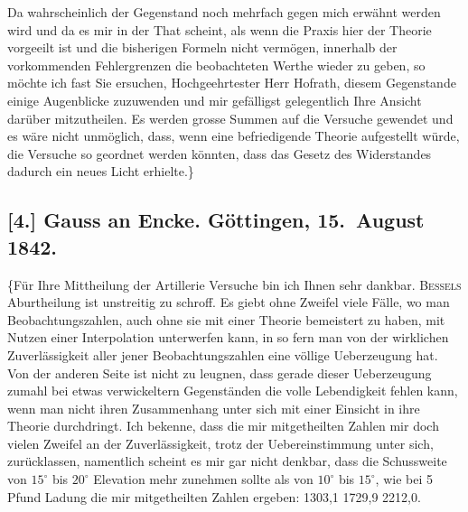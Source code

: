 \documentclass[12pt,a4paper]{article}
\begin{document}
Da wahrscheinlich der Gegenstand noch mehrfach gegen mich erw\"ahnt werden wird und da es mir in der That scheint, als wenn die Praxis hier der Theorie vorgeeilt ist und die bisherigen Formeln nicht verm\"ogen, innerhalb der vorkommenden Fehlergrenzen die beobachteten Werthe wieder zu geben, so m\"ochte ich fast Sie ersuchen, Hochgeehrtester Herr Hofrath, diesem Gegenstande einige Augenblicke zuzuwenden und mir gef\"alligst gelegentlich Ihre Ansicht dar\"uber mitzutheilen. Es werden grosse Summen auf die Versuche gewendet und es w\"are nicht unm\"oglich, dass, wenn eine befriedigende Theorie aufgestellt w\"urde, die Versuche so geordnet werden k\"onnten, dass das Gesetz des Widerstandes dadurch ein neues Licht erhielte.\dotfill\}


\subsection*{[4.] Gauss an Encke. G\"ottingen, 15.~August 1842.}

\{F\"ur Ihre Mittheilung der Artillerie Versuche bin ich Ihnen sehr dankbar. \textsc{Bessels} Aburtheilung ist unstreitig zu schroff. Es giebt ohne Zweifel viele F\"alle, wo man Beobachtungszahlen, auch ohne sie mit einer Theorie bemeistert zu haben, mit Nutzen einer Interpolation unterwerfen kann, in so fern man von der wirklichen Zuverl\"assigkeit aller jener Beobachtungszahlen eine v\"ollige Ueberzeugung hat. Von der anderen Seite ist nicht zu leugnen, dass gerade dieser Ueberzeugung zumahl bei etwas verwickeltern Gegenst\"anden die volle Lebendigkeit fehlen kann, wenn man nicht ihren Zusammenhang unter sich mit einer Einsicht in ihre Theorie durchdringt. Ich bekenne, dass die mir mitgetheilten Zahlen mir doch vielen Zweifel an der Zuverl\"assigkeit, trotz der Uebereinstimmung unter sich, zur\"ucklassen, namentlich scheint es mir gar nicht denkbar, dass die Schussweite von $15^\circ$ bis $20^\circ$ Elevation mehr zunehmen sollte als von $10^\circ$ bis $15^\circ$, wie bei 5 Pfund Ladung die mir mitgetheilten Zahlen ergeben: 1303,1 1729,9 2212,0.
\end{document}
